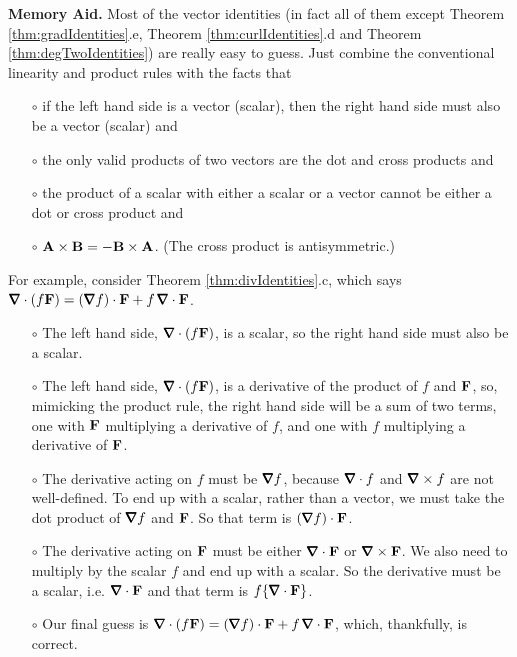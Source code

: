 \noindent\textbf{Memory Aid.}
Most of the vector identities (in fact all of them except  
       Theorem \ref{thm:gradIdentities}.e, 
       Theorem \ref{thm:curlIdentities}.d and 
       Theorem \ref{thm:degTwoIdentities}) are really easy to guess. Just combine the conventional linearity
and product rules with the facts that
\begin{itemize}\itemsep1pt \parskip0pt  %
\item[$\circ$]
if the left hand side is a vector (scalar), then the right hand side 
must also be a vector (scalar) and

\item[$\circ$] the only valid products of two vectors are the 
dot and cross products and

\item[$\circ$] the product of a scalar with either a scalar or a vector
cannot be either a dot or cross product and

\item[$\circ$] $\mathbf{A}\times\mathbf{B} = - \mathbf{B}\times\mathbf{A}$. (The cross product is antisymmetric.)
\end{itemize}
For example, consider Theorem \ref{thm:divIdentities}.c, which says
$\vnabla\cdot(f\vF)=(\vnabla f)\cdot\vF+ f\,\vnabla\cdot\vF$.
\begin{itemize}\itemsep1pt \parskip0pt  %
\item[$\circ$]
The left hand side, $\vnabla\cdot(f\vF)$, is a scalar, so the right hand
side must also be a scalar.
\item[$\circ$]
The left hand side, $\vnabla\cdot(f\vF)$, is a derivative of the product of
$f$ and $\mathbf{F}$, so, mimicking the product rule, the right hand side 
will be a sum of two terms, one
with $\mathbf{F}$ multiplying a derivative of $f$, and one with $f$
multiplying a derivative of $\mathbf{F}$.
\item[$\circ$]
The derivative acting on $f$ must be $\vnabla f$, because $\vnabla\cdot f$ 
and $\vnabla\times f$ are not well-defined. To end up with a scalar, rather 
than a vector, we must take the dot product of $\vnabla f$ and $\mathbf{F}$. 
So that term is $(\vnabla f)\cdot\vF$.

\item[$\circ$]
The derivative acting on $\mathbf{F}$ must be either $\vnabla\cdot\vF$
or $\vnabla\times\vF$. We also need to multiply by the scalar $f$
and end up with a scalar.
So the derivative must be a scalar, i.e. $\vnabla\cdot\vF$
and that term is $f\{\vnabla\cdot\vF\}$.


\item[$\circ$]
Our final guess is
$\vnabla\cdot(f\vF)=(\vnabla f)\cdot\vF+ f\,\vnabla\cdot\vF$,
which, thankfully, is correct.




\end{itemize}
